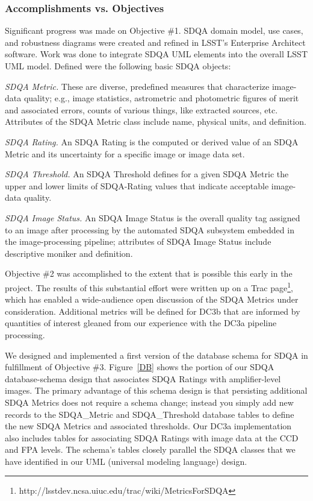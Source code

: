 \subsubsection{Accomplishments vs. Objectives}

Significant progress was made on Objective \#1.  SDQA domain model, use cases, 
and robustness diagrams were created and refined in LSST's Enterprise Architect 
software.  Work was done to integrate SDQA UML elements into the overall LSST
UML model.  Defined were the following basic SDQA objects:

\begin{description}
\item{\it SDQA Metric.}
These are diverse, predefined measures that characterize image-data quality; 
e.g., image statistics, astrometric and photometric figures of merit and associated 
errors, counts of various things, like extracted sources, etc.  Attributes of the
SDQA Metric class include name, physical units, and definition.  
\item{\it SDQA Rating.}
An SDQA Rating is 
the computed or derived value of an SDQA Metric and its uncertainty for a specific
image or image data set.  
\item{\it SDQA Threshold.}
An SDQA Threshold defines for a given SDQA Metric the 
upper and lower limits of SDQA-Rating values that indicate acceptable image-data 
quality.  \item{\it SDQA Image Status.}
An SDQA Image Status is the overall quality tag assigned to an image
after processing by the automated SDQA subsystem embedded in the image-processing
pipeline; attributes of SDQA Image Status include descriptive moniker and definition.
\end{description}

Objective \#2 was accomplished to the extent that is possible this early in the 
project.  The results of this substantial effort were written up on a Trac 
page\footnote{http://lsstdev.ncsa.uiuc.edu/trac/wiki/MetricsForSDQA}, which has 
enabled a wide-audience open discussion of the SDQA Metrics under consideration.
Additional metrics will be defined for DC3b that are informed by quantities of interest 
gleaned from our experience with the DC3a pipeline processing.

We designed and implemented a first version of the database schema for SDQA in fulfillment
of Objective \#3.  Figure~\ref{DB} shows the portion of our SDQA database-schema design
that associates SDQA Ratings with amplifier-level images.  
The primary advantage of this schema design is that persisting additional SDQA Metrics
does not require a schema change; instead you simply add new records to the SDQA\_Metric
and SDQA\_Threshold database tables to define the new SDQA Metrics and associated thresholds.
Our DC3a implementation also
includes tables for associating SDQA Ratings with image data at the CCD and FPA levels.
The schema's tables closely parallel the SDQA classes that we have identified in our UML (universal modeling language) design.


